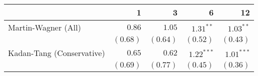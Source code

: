 \begin{tabular}{lrrrr}
\toprule
                                  &         1 &         3 &         6 &        12 \\
\midrule
Martin-Wagner (All)  & $0.86$ & $1.05$ & $1.31^{**}$ & $1.03^{**}$ \\
 & $(0.68)$ & $(0.64)$ & $(0.52)$ & $(0.43)$ \\
Kadan-Tang (Conservative)  & $0.65$ & $0.62$ & $1.22^{***}$ & $1.01^{***}$ \\
 & $(0.69)$ & $(0.77)$ & $(0.45)$ & $(0.36)$ \\
\bottomrule
\end{tabular}
\\
